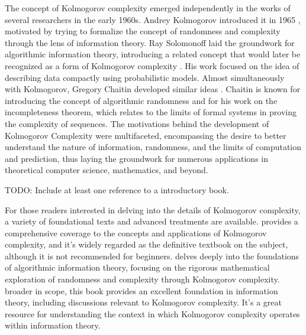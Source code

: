 The concept of Kolmogorov complexity emerged independently in the works of several researchers in the early 1960s. Andrey Kolmogorov introduced it in 1965 \cite{kolmogorov1965three}, motivated by trying to formalize the concept of randomness and complexity through the lens of information theory. Ray Solomonoff laid the groundwork for algorithmic information theory, introducing a related concept that would later be recognized as a form of Kolmogorov complexity \cite{solomonoff1964formal}. His work focused on the idea of describing data compactly using probabilistic models. Almost simultaneously with Kolmogorov, Gregory Chaitin developed similar ideas \cite{chaitin1969simplicity}. Chaitin is known for introducing the concept of algorithmic randomness and for his work on the incompleteness theorem, which relates to the limits of formal systems in proving the complexity of sequences. The motivations behind the development of Kolmogorov Complexity were multifaceted, encompassing the desire to better understand the nature of information, randomness, and the limits of computation and prediction, thus laying the groundwork for numerous applications in theoretical computer science, mathematics, and beyond.

{\color{red} TODO: Include at least one reference to a introductory book.}

For those readers interested in delving into the details of Kolmogorov complexity, a variety of foundational texts and advanced treatments are available. \cite{li2013introduction} provides a comprehensive coverage to the concepts and applications of Kolmogorov complexity, and it's widely regarded as the definitive textbook on the subject, although it is not recommended for beginners. \cite{calude2002information} delves deeply into the foundations of algorithmic information theory, focusing on the rigorous mathematical exploration of randomness and complexity through Kolmogorov complexity. \cite{cover2012elements} broader in scope, this book provides an excellent foundation in information theory, including discussions relevant to Kolmogorov complexity. It's a great resource for understanding the context in which Kolmogorov complexity operates within information theory.




